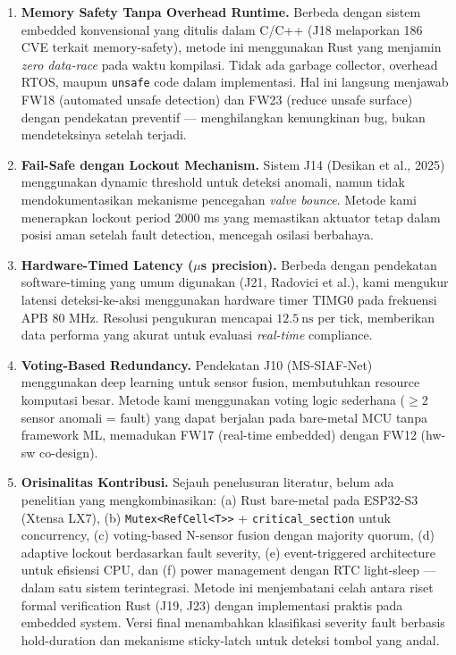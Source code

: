 \documentclass[12pt,a4paper]{article}
\begin{document}
\begin{enumerate}

\item \textbf{Memory Safety Tanpa Overhead Runtime.}
Berbeda dengan sistem embedded konvensional yang ditulis dalam C/C++ (J18 melaporkan 186 CVE terkait memory-safety), metode ini menggunakan Rust yang menjamin \textit{zero data-race} pada waktu kompilasi. Tidak ada garbage collector, overhead RTOS, maupun \texttt{unsafe} code dalam implementasi. Hal ini langsung menjawab FW18 (automated unsafe detection) dan FW23 (reduce unsafe surface) dengan pendekatan preventif --- menghilangkan kemungkinan bug, bukan mendeteksinya setelah terjadi.

\item \textbf{Fail-Safe dengan Lockout Mechanism.}
Sistem J14 (Desikan et al., 2025) menggunakan dynamic threshold untuk deteksi anomali, namun tidak mendokumentasikan mekanisme pencegahan \textit{valve bounce}. Metode kami menerapkan lockout period 2000 ms yang memastikan aktuator tetap dalam posisi aman setelah fault detection, mencegah osilasi berbahaya.

\item \textbf{Hardware-Timed Latency ($\mu$s precision).}
Berbeda dengan pendekatan software-timing yang umum digunakan (J21, Radovici et al.), kami mengukur latensi deteksi-ke-aksi menggunakan hardware timer TIMG0 pada frekuensi APB 80 MHz. Resolusi pengukuran mencapai $12.5\ \text{ns}$ per tick, memberikan data performa yang akurat untuk evaluasi \textit{real-time} compliance.

\item \textbf{Voting-Based Redundancy.}
Pendekatan J10 (MS-SIAF-Net) menggunakan deep learning untuk sensor fusion, membutuhkan resource komputasi besar. Metode kami menggunakan voting logic sederhana ($\geq 2$ sensor anomali = fault) yang dapat berjalan pada bare-metal MCU tanpa framework ML, memadukan FW17 (real-time embedded) dengan FW12 (hw-sw co-design).

\item \textbf{Orisinalitas Kontribusi.}
Sejauh penelusuran literatur, belum ada penelitian yang mengkombinasikan: (a) Rust bare-metal pada ESP32-S3 (Xtensa LX7), (b) \texttt{Mutex<RefCell<T>{}>} + \texttt{critical\_section} untuk concurrency, (c) voting-based N-sensor fusion dengan majority quorum, (d) adaptive lockout berdasarkan fault severity, (e) event-triggered architecture untuk efisiensi CPU, dan (f) power management dengan RTC light-sleep --- dalam satu sistem terintegrasi. Metode ini menjembatani celah antara riset formal verification Rust (J19, J23) dengan implementasi praktis pada embedded system. Versi final menambahkan klasifikasi severity fault berbasis hold-duration dan mekanisme sticky-latch untuk deteksi tombol yang andal.

\end{enumerate}
\end{document}
